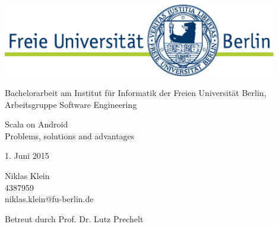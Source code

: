 \begin{titlepage}
\begin{center}

	\includegraphics[width=12cm]{asset/fu-logo.pdf}

	\vspace{1.5cm}

	Bachelorarbeit am Institut für Informatik der Freien Universität Berlin, Arbeitsgruppe Software Engineering

	\vspace{2.5cm}

	\begin{spacing}{1.3}
	\begin{huge}

		Scala on Android\\
		Problems, solutions and advantages

	\end{huge}
	\end{spacing}

	\vspace{1.2cm}

	1. Juni 2015

	\vspace{\fill}

	Niklas Klein\\
	4387959\\
	niklas.klein@fu-berlin.de

	\vspace{0.7cm}

	Betreut durch Prof. Dr. Lutz Prechelt

\end{center}
\end{titlepage}